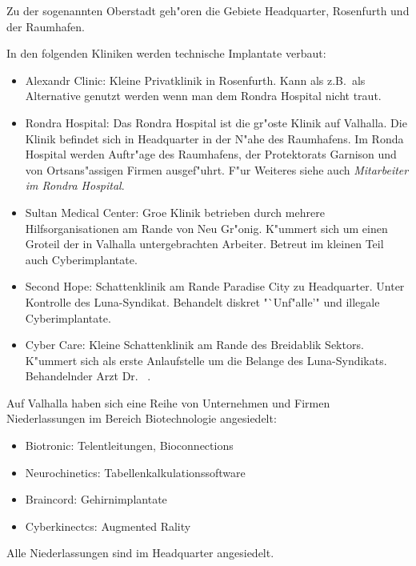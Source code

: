 Zu der sogenannten Oberstadt geh"oren die Gebiete Headquarter, Rosenfurth und der Raumhafen.



In den folgenden Kliniken werden technische Implantate verbaut:

\begin{itemize}
    \item Alexandr Clinic: Kleine Privatklinik in Rosenfurth. Kann als z.B.~als Alternative genutzt werden wenn man dem Rondra Hospital nicht traut.
    \item Rondra Hospital: Das Rondra Hospital ist die gr"os\3te Klinik auf Valhalla. Die Klinik befindet sich in Headquarter in der N"ahe des Raumhafens. Im Ronda Hospital werden Auftr"age des Raumhafens, der Protektorats Garnison und von Ortsans"assigen Firmen ausgef"uhrt. F"ur Weiteres siehe auch \emph{Mitarbeiter im Rondra Hospital}. 
    \item Sultan Medical Center: Gro\3e Klinik betrieben durch mehrere Hilfsorganisationen am Rande von Neu Gr"onig. K"ummert sich um einen Gro\3teil der in Valhalla untergebrachten Arbeiter. Betreut im kleinen Teil auch Cyberimplantate.
    \item Second Hope: Schattenklinik am Rande Paradise City zu Headquarter. Unter Kontrolle des Luna-Syndikat. Behandelt diskret "`Unf"alle'" und illegale Cyberimplantate.
    \item {} Cyber Care: Kleine Schattenklinik am Rande des Breidablik Sektors. K"ummert sich als erste Anlaufstelle um die Belange des Luna-Syndikats. Behandelnder Arzt Dr.~ .
\end{itemize}


Auf Valhalla haben sich eine Reihe von Unternehmen und Firmen Niederlassungen im Bereich Biotechnologie angesiedelt:

\begin{itemize}
    \item Biotronic: Telentleitungen, Bioconnections
    \item Neurochinetics: Tabellenkalkulationssoftware
    \item Braincord: Gehirnimplantate
    \item Cyberkinectcs: Augmented Rality
\end{itemize}

Alle Niederlassungen sind im Headquarter angesiedelt.

